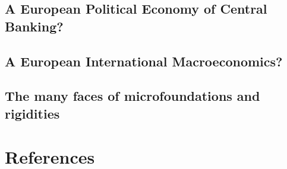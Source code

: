 \documentclass[]{elsarticle} %
\begin{document}
\hypertarget{central-banking}{%
\subsection{A European Political Economy of Central
Banking?}\label{central-banking}}

\hypertarget{international-macro}{%
\subsection{A European International
Macroeconomics?}\label{international-macro}}

\hypertarget{rigidities}{%
\subsection{The many faces of microfoundations and
rigidities}\label{rigidities}}

\newpage

\hypertarget{references}{%
\section*{References}\label{references}}
\end{document}
